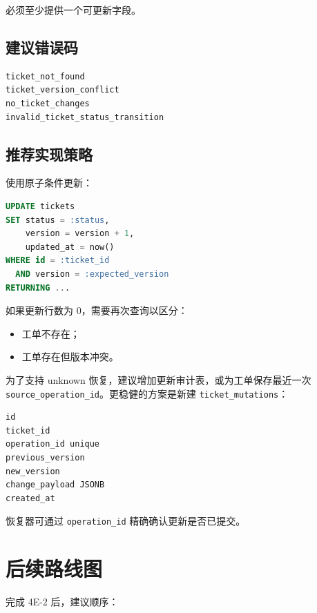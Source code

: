 \documentclass[11pt,a4paper]{ctexart}
\begin{document}
必须至少提供一个可更新字段。

\subsection{建议错误码}

\begin{lstlisting}
ticket_not_found
ticket_version_conflict
no_ticket_changes
invalid_ticket_status_transition
\end{lstlisting}

\subsection{推荐实现策略}

使用原子条件更新：

\begin{lstlisting}[language=SQL]
UPDATE tickets
SET status = :status,
    version = version + 1,
    updated_at = now()
WHERE id = :ticket_id
  AND version = :expected_version
RETURNING ...
\end{lstlisting}

如果更新行数为 0，需要再次查询以区分：

\begin{itemize}[leftmargin=2em]
  \item 工单不存在；
  \item 工单存在但版本冲突。
\end{itemize}

为了支持 unknown 恢复，建议增加更新审计表，或为工单保存最近一次
\texttt{source\_operation\_id}。更稳健的方案是新建
\texttt{ticket\_mutations}：

\begin{lstlisting}
id
ticket_id
operation_id unique
previous_version
new_version
change_payload JSONB
created_at
\end{lstlisting}

恢复器可通过 \texttt{operation\_id} 精确确认更新是否已提交。

\section{后续路线图}

完成 4E-2 后，建议顺序：
\end{document}
